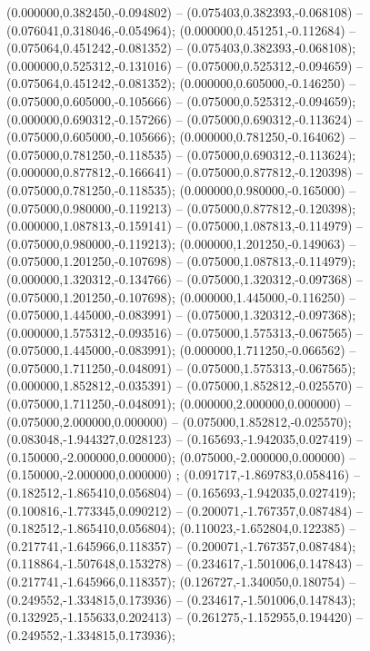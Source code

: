  (0.000000,0.382450,-0.094802) -- (0.075403,0.382393,-0.068108) -- (0.076041,0.318046,-0.054964);
 (0.000000,0.451251,-0.112684) -- (0.075064,0.451242,-0.081352) -- (0.075403,0.382393,-0.068108);
 (0.000000,0.525312,-0.131016) -- (0.075000,0.525312,-0.094659) -- (0.075064,0.451242,-0.081352);
 (0.000000,0.605000,-0.146250) -- (0.075000,0.605000,-0.105666) -- (0.075000,0.525312,-0.094659);
 (0.000000,0.690312,-0.157266) -- (0.075000,0.690312,-0.113624) -- (0.075000,0.605000,-0.105666);
 (0.000000,0.781250,-0.164062) -- (0.075000,0.781250,-0.118535) -- (0.075000,0.690312,-0.113624);
 (0.000000,0.877812,-0.166641) -- (0.075000,0.877812,-0.120398) -- (0.075000,0.781250,-0.118535);
 (0.000000,0.980000,-0.165000) -- (0.075000,0.980000,-0.119213) -- (0.075000,0.877812,-0.120398);
 (0.000000,1.087813,-0.159141) -- (0.075000,1.087813,-0.114979) -- (0.075000,0.980000,-0.119213);
 (0.000000,1.201250,-0.149063) -- (0.075000,1.201250,-0.107698) -- (0.075000,1.087813,-0.114979);
 (0.000000,1.320312,-0.134766) -- (0.075000,1.320312,-0.097368) -- (0.075000,1.201250,-0.107698);
 (0.000000,1.445000,-0.116250) -- (0.075000,1.445000,-0.083991) -- (0.075000,1.320312,-0.097368);
 (0.000000,1.575312,-0.093516) -- (0.075000,1.575313,-0.067565) -- (0.075000,1.445000,-0.083991);
 (0.000000,1.711250,-0.066562) -- (0.075000,1.711250,-0.048091) -- (0.075000,1.575313,-0.067565);
 (0.000000,1.852812,-0.035391) -- (0.075000,1.852812,-0.025570) -- (0.075000,1.711250,-0.048091);
 (0.000000,2.000000,0.000000) -- (0.075000,2.000000,0.000000) -- (0.075000,1.852812,-0.025570);
 (0.083048,-1.944327,0.028123) -- (0.165693,-1.942035,0.027419) -- (0.150000,-2.000000,0.000000);
 (0.075000,-2.000000,0.000000) -- (0.150000,-2.000000,0.000000) ;
 (0.091717,-1.869783,0.058416) -- (0.182512,-1.865410,0.056804) -- (0.165693,-1.942035,0.027419);
 (0.100816,-1.773345,0.090212) -- (0.200071,-1.767357,0.087484) -- (0.182512,-1.865410,0.056804);
 (0.110023,-1.652804,0.122385) -- (0.217741,-1.645966,0.118357) -- (0.200071,-1.767357,0.087484);
 (0.118864,-1.507648,0.153278) -- (0.234617,-1.501006,0.147843) -- (0.217741,-1.645966,0.118357);
 (0.126727,-1.340050,0.180754) -- (0.249552,-1.334815,0.173936) -- (0.234617,-1.501006,0.147843);
 (0.132925,-1.155633,0.202413) -- (0.261275,-1.152955,0.194420) -- (0.249552,-1.334815,0.173936);
